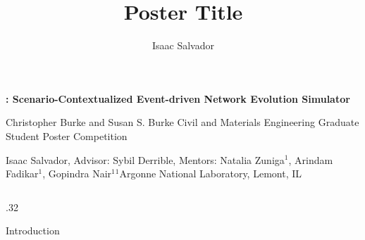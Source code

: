 \documentclass[final]{beamer}
\title{Poster Title}
\author{Isaac Salvador}
\institute{Institution}
\begin{document}
\begin{frame}[t]
  \vspace*{0.8cm}
  \begin{flushleft}
  \color{white}
  {\fontsize{90}{100}\selectfont\bfseries\textbf{}: Scenario-Contextualized Event-driven Network Evolution Simulator\par}
    \vspace{0.5cm}
    {\fontsize{56}{64}\selectfont Christopher Burke and Susan S. Burke Civil and Materials Engineering Graduate Student Poster Competition\par}
    \vspace{3.0cm}
    {\fontsize{40}{48}\selectfont Isaac Salvador, Advisor: Sybil Derrible, Mentors: Natalia Zuniga$^1$, Arindam Fadikar$^1$, Gopindra Nair$^1$\hfill $^1$Argonne National Laboratory, Lemont, IL\par}
  \end{flushleft}

  \fontsize{38}{38}\selectfont
  \begin{columns}[t,onlytextwidth]
    \begin{column}{.32\textwidth}
      \begin{chbox}{Introduction}

      


\end{chbox}
\end{column}
\end{columns}
\end{frame}
\end{document}
